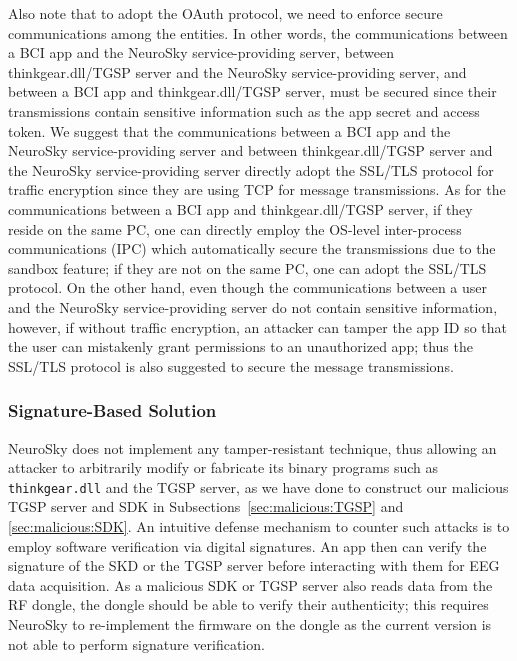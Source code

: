 Also note that to adopt the OAuth protocol, we need to enforce secure communications among the entities. In other words, the communications between a BCI app and the NeuroSky service-providing server, between thinkgear.dll/TGSP server and the NeuroSky service-providing server, and between a BCI app and thinkgear.dll/TGSP server, must be secured since their transmissions contain sensitive information such as the app secret and access token. We suggest that the communications between a BCI app and the NeuroSky service-providing server and between thinkgear.dll/TGSP server and the NeuroSky service-providing server directly adopt the SSL/TLS protocol for traffic encryption since they are using TCP for message transmissions. As for the communications between a BCI app and thinkgear.dll/TGSP server, if they reside on the same PC, one can directly employ the OS-level inter-process communications (IPC) which automatically secure the transmissions due to the sandbox feature; if they are not on the same PC, one can adopt the SSL/TLS protocol. On the other hand, even though the communications between a user and the NeuroSky service-providing server do not contain sensitive information, however, if without traffic encryption, an attacker can tamper the app ID so that the user can mistakenly grant permissions to an unauthorized app; thus the SSL/TLS protocol is also suggested to secure the message transmissions. 

\subsubsection{Signature-Based Solution}
NeuroSky does not implement any tamper-resistant technique, thus allowing an attacker to arbitrarily modify or fabricate its binary programs such as \texttt{thinkgear.dll} and the TGSP server, as we have done to construct our malicious TGSP server and SDK in Subsections~\ref{sec:malicious:TGSP} and \ref{sec:malicious:SDK}. An intuitive defense mechanism to counter such attacks is to employ software verification via digital signatures. An app then can verify the signature of the SKD or the TGSP server before interacting with them for EEG data acquisition. As a malicious SDK or TGSP server also reads data from the RF dongle, the dongle should be able to verify their authenticity; this requires NeuroSky to re-implement the firmware on the dongle as the current version is not able to perform signature verification. 

